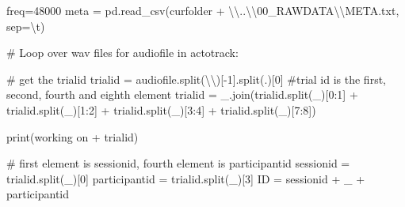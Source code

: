 \documentclass[
  letterpaper,
  DIV=11,
  numbers=noendperiod]{scrreprt}
\newenvironment{Shaded}{\begin{snugshade}}{\end{snugshade}}
\newcommand{\BuiltInTok}[1]{\textcolor[rgb]{0.00,0.23,0.31}{#1}}
\newcommand{\CharTok}[1]{\textcolor[rgb]{0.13,0.47,0.30}{#1}}
\newcommand{\CommentTok}[1]{\textcolor[rgb]{0.37,0.37,0.37}{#1}}
\newcommand{\ControlFlowTok}[1]{\textcolor[rgb]{0.00,0.23,0.31}{#1}}
\newcommand{\DecValTok}[1]{\textcolor[rgb]{0.68,0.00,0.00}{#1}}
\newcommand{\KeywordTok}[1]{\textcolor[rgb]{0.00,0.23,0.31}{#1}}
\newcommand{\NormalTok}[1]{\textcolor[rgb]{0.00,0.23,0.31}{#1}}
\newcommand{\OperatorTok}[1]{\textcolor[rgb]{0.37,0.37,0.37}{#1}}
\newcommand{\StringTok}[1]{\textcolor[rgb]{0.13,0.47,0.30}{#1}}
\begin{document}
\begin{Shaded}
\begin{Highlighting}[]
\NormalTok{freq}\OperatorTok{=}\DecValTok{48000}    
\NormalTok{meta }\OperatorTok{=}\NormalTok{ pd.read\_csv(curfolder }\OperatorTok{+} \StringTok{\textquotesingle{}}\CharTok{\textbackslash{}\textbackslash{}}\StringTok{..}\CharTok{\textbackslash{}\textbackslash{}}\StringTok{00\_RAWDATA}\CharTok{\textbackslash{}\textbackslash{}}\StringTok{META.txt\textquotesingle{}}\NormalTok{, sep}\OperatorTok{=}\StringTok{\textquotesingle{}}\CharTok{\textbackslash{}t}\StringTok{\textquotesingle{}}\NormalTok{)}

\CommentTok{\# Loop over wav files}
\ControlFlowTok{for}\NormalTok{ audiofile }\KeywordTok{in}\NormalTok{ actotrack:}

    \CommentTok{\# get the trialid}
\NormalTok{    trialid }\OperatorTok{=}\NormalTok{ audiofile.split(}\StringTok{\textquotesingle{}}\CharTok{\textbackslash{}\textbackslash{}}\StringTok{\textquotesingle{}}\NormalTok{)[}\OperatorTok{{-}}\DecValTok{1}\NormalTok{].split(}\StringTok{\textquotesingle{}.\textquotesingle{}}\NormalTok{)[}\DecValTok{0}\NormalTok{]}
    \CommentTok{\#trial id is the first, second, fourth and eighth element}
\NormalTok{    trialid }\OperatorTok{=} \StringTok{\textquotesingle{}\_\textquotesingle{}}\NormalTok{.join(trialid.split(}\StringTok{\textquotesingle{}\_\textquotesingle{}}\NormalTok{)[}\DecValTok{0}\NormalTok{:}\DecValTok{1}\NormalTok{] }\OperatorTok{+}\NormalTok{ trialid.split(}\StringTok{\textquotesingle{}\_\textquotesingle{}}\NormalTok{)[}\DecValTok{1}\NormalTok{:}\DecValTok{2}\NormalTok{] }\OperatorTok{+}\NormalTok{ trialid.split(}\StringTok{\textquotesingle{}\_\textquotesingle{}}\NormalTok{)[}\DecValTok{3}\NormalTok{:}\DecValTok{4}\NormalTok{] }\OperatorTok{+}\NormalTok{ trialid.split(}\StringTok{\textquotesingle{}\_\textquotesingle{}}\NormalTok{)[}\DecValTok{7}\NormalTok{:}\DecValTok{8}\NormalTok{])}

    \BuiltInTok{print}\NormalTok{(}\StringTok{\textquotesingle{}working on \textquotesingle{}} \OperatorTok{+}\NormalTok{ trialid)}

    \CommentTok{\# first element is sessionid, fourth element is participantid}
\NormalTok{    sessionid }\OperatorTok{=}\NormalTok{ trialid.split(}\StringTok{\textquotesingle{}\_\textquotesingle{}}\NormalTok{)[}\DecValTok{0}\NormalTok{]}
\NormalTok{    participantid }\OperatorTok{=}\NormalTok{ trialid.split(}\StringTok{\textquotesingle{}\_\textquotesingle{}}\NormalTok{)[}\DecValTok{3}\NormalTok{]}
\NormalTok{    ID }\OperatorTok{=}\NormalTok{ sessionid }\OperatorTok{+} \StringTok{\textquotesingle{}\_\textquotesingle{}} \OperatorTok{+}\NormalTok{ participantid}


\end{Highlighting}
\end{Shaded}
\end{document}
